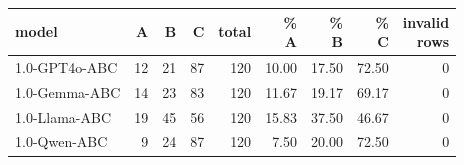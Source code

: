 \begin{tabular}{lrrrrrrrr}
\toprule
model & A & B & C & total & \makecell{\%\\A} & \makecell{\%\\B} & \makecell{\%\\C} & \makecell{invalid\\rows} \\
\midrule
1.0-GPT4o-ABC & 12 & 21 & 87 & 120 & 10.00 & 17.50 & 72.50 & 0 \\
1.0-Gemma-ABC & 14 & 23 & 83 & 120 & 11.67 & 19.17 & 69.17 & 0 \\
1.0-Llama-ABC & 19 & 45 & 56 & 120 & 15.83 & 37.50 & 46.67 & 0 \\
1.0-Qwen-ABC & 9 & 24 & 87 & 120 & 7.50 & 20.00 & 72.50 & 0 \\
\bottomrule
\end{tabular}
